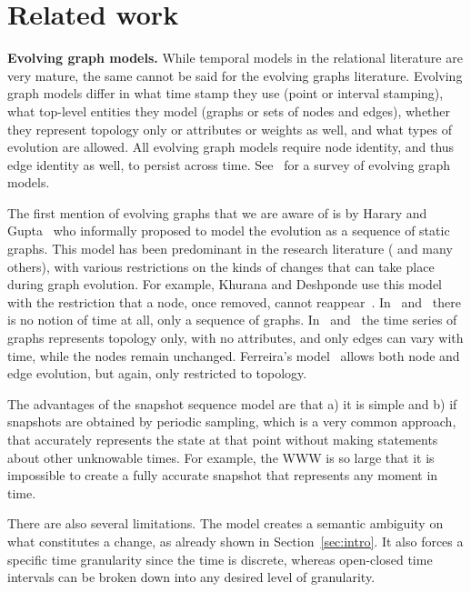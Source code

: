 \section{Related work}
\label{sec:related}

{\bf Evolving graph models.}  While temporal models in the relational
literature are very mature, the same cannot be said for the evolving
graphs literature.  Evolving graph models differ in what time stamp
they use (point or interval stamping), what top-level entities they
model (graphs or sets of nodes and edges), whether they represent
topology only or attributes or weights as well, and what types of
evolution are allowed.  All evolving graph models require node
identity, and thus edge identity as well, to persist across time.
See~\cite{Zaki2016} for a survey of evolving graph models.

The first mention of evolving graphs that we are aware of is by Harary
and Gupta~\cite{Harary1997} who informally proposed to model the
evolution as a sequence of static graphs.  This model has been
predominant in the research literature
(\cite{Borgwardt2006,Fard2012,Ferreira2004,Kan2009,Khurana2013,Ren2011}
and many others), with various restrictions on the kinds of changes
that can take place during graph evolution.  For example, Khurana and
Deshponde use this model with the restriction that a node, once
removed, cannot reappear~\cite{Khurana2013}.  In~\cite{Ren2011}
and~\cite{Fard2012} there is no notion of time at all, only a sequence
of graphs.  In~\cite{Borgwardt2006} and~\cite{Kan2009} the time series
of graphs represents topology only, with no attributes, and only edges
can vary with time, while the nodes remain unchanged.  Ferreira's
model~\cite{Ferreira2004} allows both node and edge evolution, but
again, only restricted to topology.

The advantages of the snapshot sequence model are that a) it is simple
and b) if snapshots are obtained by periodic sampling, which is a very
common approach, that accurately represents the state at that point
without making statements about other unknowable times.  For example,
the WWW is so large that it is impossible to create a fully accurate
snapshot that represents any moment in time.

There are also several limitations.  The model creates a semantic
ambiguity on what constitutes a change, as already shown in
Section~\ref{sec:intro}.  It also forces a specific time granularity
since the time is discrete, whereas open-closed time intervals can be
broken down into any desired level of granularity.

